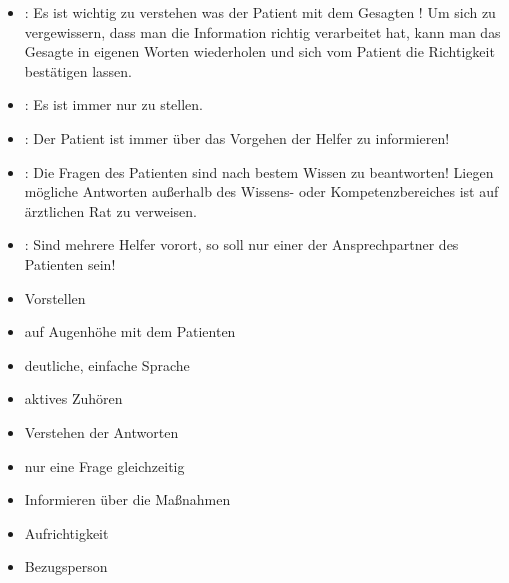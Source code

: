 {\begin{itemize}
    Negativbeispiel: \begin{quote}\end{quote}
    \item {}: Es ist wichtig zu verstehen was der
    Patient mit dem Gesagten ! Um sich zu vergewissern, dass man die
    Information richtig verarbeitet hat, kann man das Gesagte in
    eigenen Worten wiederholen und sich vom Patient die Richtigkeit bestätigen
    lassen.
    \item {}: Es ist immer nur  zu stellen.
    \item {}: Der Patient ist immer über das Vorgehen der Helfer
    zu informieren!
    \item {}: Die Fragen des
    Patienten sind nach bestem Wissen zu beantworten!  Liegen mögliche Antworten außerhalb des Wissens-
    oder Kompetenzbereiches ist auf ärztlichen Rat zu verweisen.
    \item {}: Sind mehrere Helfer
    vorort, so soll nur einer der Ansprechpartner des
    Patienten sein!\label{topic:einer-redet}
\end{itemize}
}{
\begin{itemize}
  \item Vorstellen
  \item auf Augenhöhe mit dem Patienten
  \item deutliche, einfache Sprache
  \item aktives Zuhören
  \item Verstehen der Antworten
  \item nur eine Frage gleichzeitig
  \item Informieren über die Maßnahmen
  \item Aufrichtigkeit
  \item Bezugsperson
\end{itemize}
}{}{}{}

